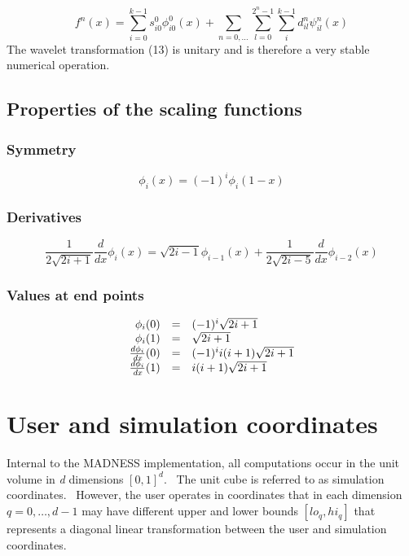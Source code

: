\documentclass[letterpaper]{book}
\begin{document}
\begin{equation}\label{seq:refText12}
f^{n}(x)=\sum _{i=0}^{k-1}s_{i0}^{0}\phi _{i0}^{0}(x)+\sum _{n=0,\ldots }\sum _{l=0}^{2^{n}-1}\sum
_{i}^{k-1}d_{il}^{n}\psi _{il}^{n}(x)
\end{equation}
The wavelet transformation (13) is unitary and is therefore a very stable numerical operation.

\subsection{Properties of the scaling functions}
\subsubsection{Symmetry}
\begin{equation}
\phi _{i}(x)=(-1)^{i}\phi _{i}(1-x)
\end{equation}
\subsubsection{Derivatives}
\begin{equation}
\frac{1}{2\sqrt{2i+1}}\frac{d}{\mathit{dx}}\phi _{i}(x)=\sqrt{2i-1}\phi
_{i-1}(x)+\frac{1}{2\sqrt{2i-5}}\frac{d}{\mathit{dx}}\phi _{i-2}(x)
\end{equation}
\subsubsection[Values at end points]{Values at end points}

\bigskip

\begin{equation}
\begin{matrix}\hfill \phi _{i}(0)&\text{=}&(-1)^{i}\sqrt{2i+1}\hfill\null \\\hfill \phi
_{i}(1)&\text{=}&\sqrt{2i+1}\hfill\null \\\hfill \frac{d\phi
_{i}}{\mathit{dx}}(0)&\text{=}&(-1)^{i}i(i+1)\sqrt{2i+1}\hfill\null \\\hfill \frac{d\phi
_{i}}{\mathit{dx}}(1)&\text{=}&i(i+1)\sqrt{2i+1}\hfill\null \end{matrix}
\end{equation}
\section{User and simulation coordinates}
Internal to the MADNESS implementation, all computations occur in the unit volume in \textit{d }dimensions  $[0,1]^{d}$.
\ The unit cube is referred to as simulation coordinates. \ However, the user operates in coordinates that in each
dimension  $q=0,\ldots ,d-1$ may have different upper and lower bounds 
$[\mathrm{{\mathit{lo}}}_{q},\mathrm{{\mathit{hi}}}_{q}]$ that represents a diagonal linear transformation between the
user and simulation coordinates.
\end{document}
